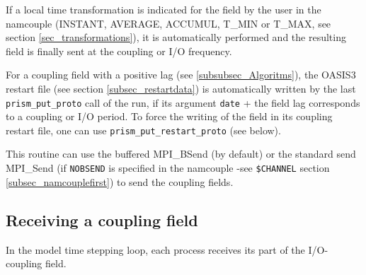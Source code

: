 If a local time transformation is indicated for the field by
the user in the namcouple (INSTANT, AVERAGE, ACCUMUL, T\_MIN or T\_MAX,
see section \ref{sec_transformations}), it is automatically performed
and the resulting field is finally sent at the coupling or I/O
frequency.

For a coupling field with a positive lag (see
\ref{subsubsec_Algoritms}), the OASIS3 restart file (see section
\ref{subsec_restartdata}) is automatically written by the
last {\tt prism\_put\_proto} call of the run, if its argument {\tt date}
+ the field lag corresponds to a coupling or I/O period. To
force the writing of the field in its coupling restart file, one can
use {\tt prism\_put\_restart\_proto} (see below).

This routine can use the buffered MPI\_BSend (by default) or the
standard send MPI\_Send (if {\tt NOBSEND} is specified in the
namcouple -see {\tt \$CHANNEL} section
\ref{subsec_namcouplefirst}) to send the coupling fields.

\vspace*{0.5cm}

\subsection{Receiving a coupling field}

\vspace*{0.5cm}

In the model time stepping loop, each process
receives its part of the I/O-coupling field. 

